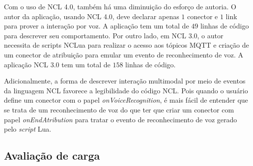 Com o uso de NCL 4.0, também há uma diminuição do esforço de autoria. O autor da aplicação, usando NCL 4.0, deve declarar apenas $1$ conector e $1$ link para prover a interação por voz. A aplicação tem um total de $49$ linhas de código para descrever seu comportamento. Por outro lado, em NCL 3.0, o autor necessita de scripts NCLua para realizar o acesso aos tópicos MQTT e criação de um conector de atribuição para emular um evento de reconhecimento de voz. A aplicação NCL 3.0 tem um total de $158$ linhas de código.

Adicionalmente, a forma de descrever interação multimodal por meio de eventos da linguagem NCL favorece a legibilidade do código NCL. Pois quando o usuário define um conector com o papel \textit{onVoiceRecognition}, é mais fácil de entender que se trata de um reconhecimento de voz do que ter que criar um conector com papel  \textit{onEndAtribution} para tratar o evento de reconhecimento de voz gerado pelo \textit{script} Lua.

\subsection{Avaliação de carga} \label{sec:cargaNCL40}

